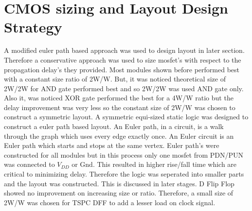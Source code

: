 \documentclass[conference]{IEEEtran}
\begin{document}
\section{CMOS sizing and Layout Design Strategy}
A modified euler path based approach was used to design layout in later section. Therefore a conservative approach was used to size mosfet's with respect to the propagation delay's they provided. Most modules shown before performed best with a constant size ratio of 2W/W. But, it was noticed theoretical size of 2W/2W for AND gate performed best and so 2W/2W was used AND gate only. Also it, was noticed XOR gate performed the best for a 4W/W ratio but the delay improvement was very less so the constant size of 2W/W was chosen to construct a symmetric layout. A symmetric equi-sized static logic was designed to construct a euler path based layout.\newline
An Euler path, in a circuit, is a walk through the graph which uses every edge exactly once. An Euler circuit is an Euler path which starts and stops at the same vertex. Euler path's were constructed for all modules but in this process only one mosfet from PDN/PUN was connected to $V_{DD}$ or Gnd. This resulted in higher rise/fall time which are critical to minimizing delay. Therefore the logic was seperated into smaller parts and the layout was constructed. This is discussed in later stages. \newline
D Flip Flop showed no improvement on increasing size or ratio. Therefore, a small size of 2W/W was chosen for TSPC DFF to add a lesser load on clock signal. 
\end{document}
